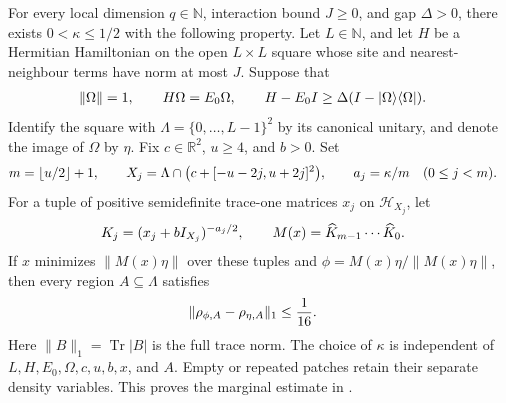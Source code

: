 \begin{theorem}
    \label{thm:peps_uniform_nested_patch_marginal_closeness}
    For every local dimension $q\in\mathbb N$, interaction bound $J\geq0$,
    and gap $\Delta>0$, there exists $0<\kappa\leq1/2$ with the following
    property. Let $L\in\mathbb N$, and let $H$ be a Hermitian Hamiltonian
    on the open $L\times L$ square whose site and nearest-neighbour terms
    have norm at most $J$. Suppose that
    \begin{align}
         & \|\Omega\|=1,\qquad H\Omega=E_0\Omega,\qquad
        H-E_0I\geq\Delta(I-|\Omega\rangle\langle\Omega|). \notag
    \end{align}
    Identify the square with $\Lambda=\{0,\ldots,L-1\}^2$ by its canonical
    unitary, and denote the image of $\Omega$ by $\eta$.
    Fix $c\in\mathbb R^2$, $u\geq4$, and $b>0$. Set
    \begin{align}
         & m=\lfloor u/2\rfloor+1,\qquad
        X_j=\Lambda\cap\bigl(c+[-u-2j,u+2j]^2\bigr),\qquad
        a_j=\kappa/m\quad(0\leq j<m). \notag
    \end{align}
    For a tuple of positive semidefinite trace-one matrices $x_j$ on
    $\mathcal H_{X_j}$, let
    \begin{align}
         & K_j=(x_j+bI_{X_j})^{-a_j/2},\qquad
        M(x)=\widehat K_{m-1}\cdots\widehat K_0. \notag
    \end{align}
    If $x$ minimizes $\|M(x)\eta\|$ over these tuples and
    $\phi=M(x)\eta/\|M(x)\eta\|$, then every region $A\subseteq\Lambda$
    satisfies
    \begin{align}
         & \|\rho_{\phi,A}-\rho_{\eta,A}\|_1\leq\frac1{16}. \notag
    \end{align}
    Here $\|B\|_1=\operatorname{Tr}|B|$ is the full trace norm. The choice
    of $\kappa$ is independent of $L,H,E_0,\Omega,c,u,b,x$, and $A$.
    Empty or repeated patches retain their separate density variables.
    This proves the marginal estimate in
    \cite[Proposition~4.1]{OpenAI2026PolynomialPEPS}.
\end{theorem}
